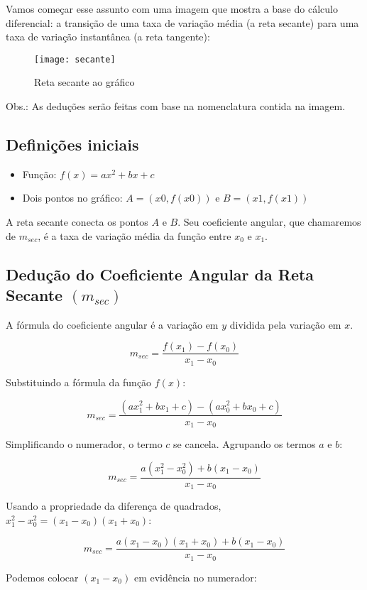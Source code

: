 \documentclass[../resumo.tex]{subfiles}
\begin{document}
	Vamos começar esse assunto com uma imagem que mostra a base do cálculo diferencial:
	a transição de uma taxa de variação média (a reta secante) para uma taxa de variação instantânea (a reta tangente):

	\begin{figure}[H]
		\centering
		\texttt{[image: secante]}
		\caption{Reta secante ao gráfico}
		\label{fig:secante}
	\end{figure}

	Obs.: As deduções serão feitas com base na nomenclatura contida na imagem.

	\subsection{Definições iniciais}
	
	\begin{itemize}
		\item Função: $f(x) = ax^2 + bx + c$
		\item Dois pontos no gráfico: $A = (x0, f(x0))$ e $B = (x1, f(x1))$
	\end{itemize}

	A reta secante conecta os pontos $A$ e $B$. Seu coeficiente angular, que chamaremos de $m_{sec}$,
	é a taxa de variação média da função entre $x_0$ e $x_1$.

	\subsection{Dedução do Coeficiente Angular da Reta Secante $(m_{sec})$}

	A fórmula do coeficiente angular é a variação em $y$ dividida pela variação em $x$.

	\[ m_{sec} = \frac{f(x_1) - f(x_0)}{x_1 - x_0} \]

	Substituindo a fórmula da função $f(x)$:

	\[ m_{sec} = \frac{(ax_1^2 + bx_1 + c) - (ax_0^2 + bx_0 + c)}{x_1 - x_0} \]

	Simplificando o numerador, o termo $c$ se cancela. Agrupando os termos $a$ e $b$:

	\[ m_{sec} = \frac{a(x_1^2 - x_0^2) + b(x_1 - x_0)}{x_1 - x_0} \]

	Usando a propriedade da diferença de quadrados, $x_1^2 - x_0^2 = (x_1 - x_0)(x_1 + x_0)$:

	\[ m_{sec} = \frac{a(x_1 - x_0)(x_1 + x_0) + b(x_1 - x_0)}{x_1 - x_0} \]

	Podemos colocar $(x_1 - x_0)$ em evidência no numerador:
\end{document}
